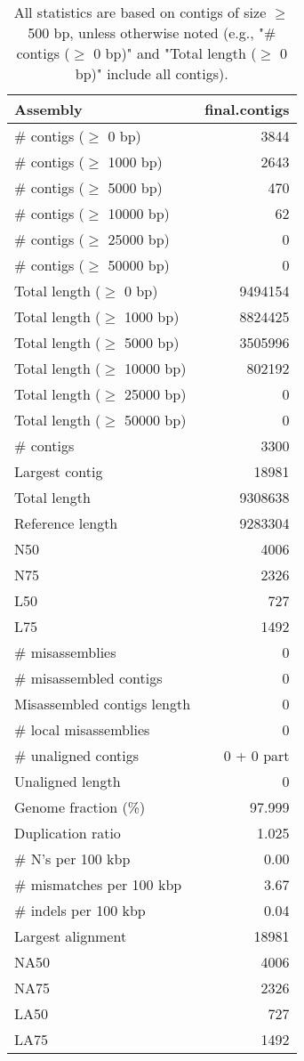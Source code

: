 \documentclass[12pt,a4paper]{article}
\begin{document}
\begin{table}[ht]
\begin{center}
\caption{All statistics are based on contigs of size $\geq$ 500 bp, unless otherwise noted (e.g., "\# contigs ($\geq$ 0 bp)" and "Total length ($\geq$ 0 bp)" include all contigs).}
\begin{tabular}{|l*{1}{|r}|}
\hline
Assembly & final.contigs \\ \hline
\# contigs ($\geq$ 0 bp) & 3844 \\ \hline
\# contigs ($\geq$ 1000 bp) & 2643 \\ \hline
\# contigs ($\geq$ 5000 bp) & 470 \\ \hline
\# contigs ($\geq$ 10000 bp) & 62 \\ \hline
\# contigs ($\geq$ 25000 bp) & 0 \\ \hline
\# contigs ($\geq$ 50000 bp) & 0 \\ \hline
Total length ($\geq$ 0 bp) & 9494154 \\ \hline
Total length ($\geq$ 1000 bp) & 8824425 \\ \hline
Total length ($\geq$ 5000 bp) & 3505996 \\ \hline
Total length ($\geq$ 10000 bp) & 802192 \\ \hline
Total length ($\geq$ 25000 bp) & 0 \\ \hline
Total length ($\geq$ 50000 bp) & 0 \\ \hline
\# contigs & 3300 \\ \hline
Largest contig & 18981 \\ \hline
Total length & 9308638 \\ \hline
Reference length & 9283304 \\ \hline
N50 & 4006 \\ \hline
N75 & 2326 \\ \hline
L50 & 727 \\ \hline
L75 & 1492 \\ \hline
\# misassemblies & 0 \\ \hline
\# misassembled contigs & 0 \\ \hline
Misassembled contigs length & 0 \\ \hline
\# local misassemblies & 0 \\ \hline
\# unaligned contigs & 0 + 0 part \\ \hline
Unaligned length & 0 \\ \hline
Genome fraction (\%) & 97.999 \\ \hline
Duplication ratio & 1.025 \\ \hline
\# N's per 100 kbp & 0.00 \\ \hline
\# mismatches per 100 kbp & 3.67 \\ \hline
\# indels per 100 kbp & 0.04 \\ \hline
Largest alignment & 18981 \\ \hline
NA50 & 4006 \\ \hline
NA75 & 2326 \\ \hline
LA50 & 727 \\ \hline
LA75 & 1492 \\ \hline
\end{tabular}
\end{center}
\end{table}
\end{document}
